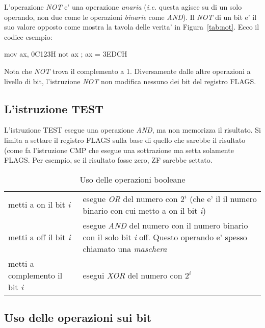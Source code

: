 L'operazione \emph{NOT} e' una operazione \emph{unaria} (\emph{i.e.} 
questa agisce su di un solo operando, non due come le operazioni
\emph{binarie} come \emph{AND}). Il \emph{NOT} di un bit e' il suo 
valore opposto come mostra la tavola delle verita' in Figura~\ref{tab:not}.
Ecco il codice esempio:

\begin{AsmCodeListing}[frame=none]
      mov    ax, 0C123H
      not    ax                 ; ax = 3EDCH
\end{AsmCodeListing}

Nota che \emph{NOT} trova il complemento a 1. Diversamente dalle altre
operazioni a livello di bit, l'istruzione \emph{NOT} non modifica nessuno
dei bit del registro {\code FLAGS}.

\subsection{L'istruzione {\code TEST}}

L'istruzione {\code TEST} esegue una operazione \emph{AND}, ma non 
memorizza il risultato. Si limita a settare il registro {\code FLAGS}
sulla base di quello che sarebbe il risultato (come fa l'istruzione
{\code CMP} che esegue una sottrazione ma setta solamente {\code FLAGS}.
Per esempio, se il risultato fosse zero, {\code ZF} sarebbe settato.
\begin{table}
\begin{tabular}{lp{3in}}
metti a on il bit \emph{i} & esegue \emph{OR} del numero con $2^i$ (che e' il
                              il numero binario con cui metto a on il bit \emph{i}) \\
metti a off il bit \emph{i} & esegue \emph{AND} del numero con il numero binario 
                              con il solo bit \emph{i} off. Questo operando e' spesso
                              chiamato una \emph{maschera} \\
metti a complemento il bit \emph{i} & esegui \emph{XOR} del numero con $2^i$
\end{tabular}
\caption{Uso delle operazioni booleane \label{tab:bool}}
\end{table}

\subsection{Uso delle operazioni sui bit}

